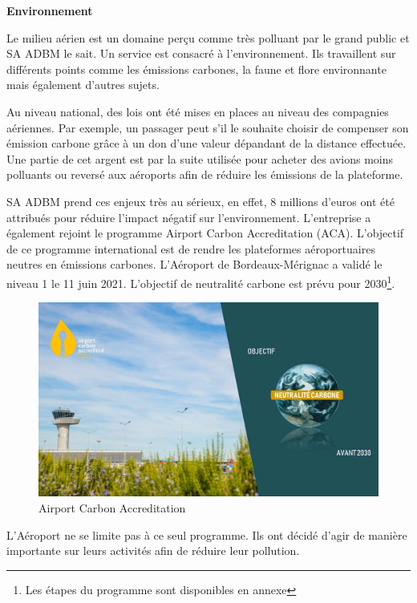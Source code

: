 \textbf{Environnement}\newline

Le milieu aérien est un domaine perçu comme très polluant par le grand public et SA ADBM le sait. Un service est consacré à l'environnement. Ils travaillent sur différents points comme les émissions carbones, la faune et flore environnante mais également d'autres sujets.


Au niveau national, des lois ont été mises en places au niveau des compagnies aériennes. Par exemple, un passager peut s'il le souhaite choisir de compenser son émission carbone grâce à un don d'une valeur dépandant de la distance effectuée.
Une partie de cet argent est par la suite utilisée pour acheter des avions moins polluants ou reversé aux aéroports afin de réduire les émissions de la plateforme.\newline

SA ADBM prend ces enjeux très au sérieux, en effet, 8 millions d'euros ont été attribués pour réduire l'impact négatif sur l'environnement.
L'entreprise a également rejoint le programme Airport Carbon Accreditation (ACA). L'objectif de ce programme international est de rendre les plateformes aéroportuaires neutres en émissions carbones.
L'Aéroport de Bordeaux-Mérignac a validé le niveau 1 le 11 juin 2021. L'objectif de neutralité carbone est prévu pour 2030\footnote{Les étapes du programme sont disponibles en annexe}.

\begin{figure}[hbt!]
  \centering
  \includegraphics[width=12cm]{Images/aca2030.jpg}
  \caption{Airport Carbon Accreditation}
  \label{fig:aca2030}
\end{figure}


L'Aéroport ne se limite pas à ce seul programme. Ils ont décidé d'agir de manière importante sur leurs activités afin de réduire leur pollution.


